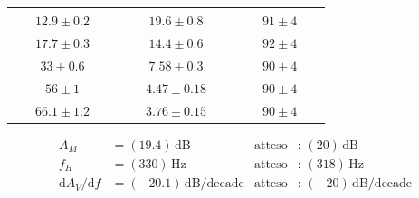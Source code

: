 \documentclass[10pt,a4paper]{article}
\newcommand{\exn}{\phantom{xxx}}
\begin{document}
\begin{table}[h]
\begin{tabular}{|c|c|c|}
				$\exn 12.9\pm 0.2 \exn $  & $\exn 19.6 \pm 0.8 \exn $ & $\exn 91 \pm  4\exn $ \\
				\hline
				$\exn 17.7\pm 0.3\exn $ & $\exn14.4\pm 0.6 \exn $ & $\exn 92\pm4\exn $ \\

				\hline
				$\exn 33\pm 0.6\exn $& $\exn7.58 \pm  0.3
   \exn $ & $\exn90 \pm 4 \exn $ \\
				\hline
				$\exn 56\pm 1 \exn $  & $\exn 4.47\pm0.18   \exn $ & $\exn 90\pm 4\exn $ \\
				
				
				\hline
				$\exn 66.1\pm 1.2\exn $ & $\exn3.76 \pm  0.15 \exn $ & $\exn90 \pm 4\exn $ \\
			
				
				\hline
				
				
				
				
			\end{tabular}
\end{table}



	 
	


	
	\begin{align*}
	A_M &= (19.4 )\,\mathrm{dB} & \mathrm{atteso} &:\,(20  )\, \mathrm{dB}  \\
	f_H &= (330 )\,\mathrm{Hz} & \mathrm{atteso} &:\,(318  )\, \mathrm{Hz} \\
	{\mathrm{d}A_V}/{\mathrm{d}f} &= (-20.1 )\,\mathrm{dB/decade} & \mathrm{atteso} &:\,(-20  )\, \mathrm{dB/decade}  \\
	\end{align*}
	
	\clearpage
\end{document}
